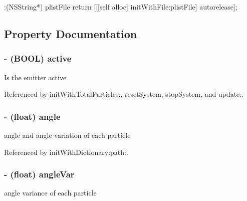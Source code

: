 \begin{DoxyCode}
                      :(NSString*) plistFile
{
        return [[[self alloc] initWithFile:plistFile] autorelease];
}
\end{DoxyCode}


\subsection{Property Documentation}
\hypertarget{interface_c_c_particle_system_a60a75227e9a8c6b834ac8b60c4fe42a8}{
\subsubsection[{active}]{\setlength{\rightskip}{0pt plus 5cm}-\/ (B\-O\-O\-L) {\bf active}}}\label{interface_c_c_particle_system_a60a75227e9a8c6b834ac8b60c4fe42a8}
Is the emitter active 

Referenced by init\-With\-Total\-Particles\-:, reset\-System, stop\-System, and update\-:.

\hypertarget{interface_c_c_particle_system_a980fb9469018469875f032ad6b42f0b7}{
\subsubsection[{angle}]{\setlength{\rightskip}{0pt plus 5cm}-\/ (float) {\bf angle}}}\label{interface_c_c_particle_system_a980fb9469018469875f032ad6b42f0b7}
angle and angle variation of each particle 

Referenced by init\-With\-Dictionary\-:path\-:.

\hypertarget{interface_c_c_particle_system_a64d7a73dde3c88b4a151eb1e2fcc330b}{
\subsubsection[{angle\-Var}]{\setlength{\rightskip}{0pt plus 5cm}-\/ (float) {\bf angle\-Var}}}\label{interface_c_c_particle_system_a64d7a73dde3c88b4a151eb1e2fcc330b}
angle variance of each particle 

